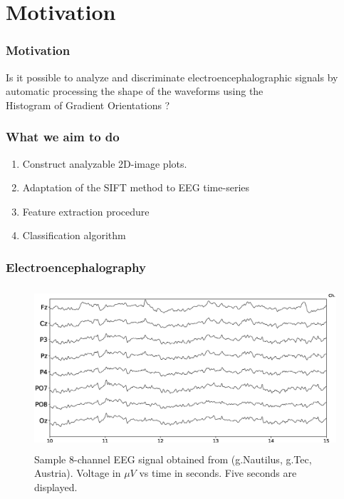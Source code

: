 \documentclass[aspectratio=169]{beamer}
\newcommand\Fontre{\fontsize{16}{16.2}\selectfont}
\begin{document}
    \section{Motivation}
    \begin{frame}
        \frametitle{Motivation}
        \begin{center}
                \LARGE Is it possible to analyze and discriminate electroencephalographic signals by automatic processing the shape of the waveforms using the \\ Histogram of Gradient Orientations ?
        \end{center}
    \end{frame}
    \begin{frame}
    
\frametitle{What we aim to do}
\begin{center}
\begin{enumerate}
\item<1-> \Fontre Construct analyzable 2D-image plots.
\item<2-> \Fontre Adaptation of the SIFT method to EEG time-series
\item<3-> \Fontre Feature extraction procedure
\item<4-> \Fontre Classification algorithm
\end{enumerate}
\end{center}
\end{frame}
    
\begin{frame}
\frametitle{Electroencephalography}
\begin{center}
\begin{figure}[]
\centering
\includegraphics[height=6.0cm,width=14cm]{images/sampleeeg.eps}
\caption{Sample 8-channel EEG signal obtained from (g.Nautilus, g.Tec, Austria). Voltage in $\mu V$ vs time in seconds. Five seconds are displayed.}
\label{fig:sampleeeg}
\end{figure}
\end{center}
\end{frame}
\end{document}
